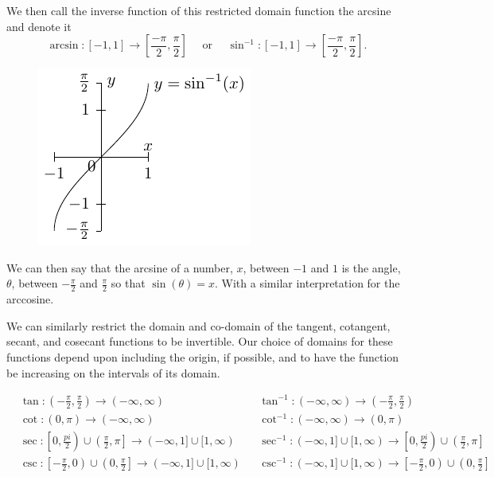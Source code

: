 \documentclass[
]{book}
\theoremstyle{definition}
\theoremstyle{definition}
\theoremstyle{definition}
\theoremstyle{definition}
\theoremstyle{remark}
\begin{document}
We then call the inverse function of this restricted domain function the arcsine and denote it
\[\arcsin:[-1,1] \rightarrow \left[\frac{-\pi}{2}, \frac{\pi}{2}\right] \quad \mbox{ or } \quad \sin^{-1}:[-1,1] \rightarrow \left[\frac{-\pi}{2}, \frac{\pi}{2}\right].\]

\begin{figure}

{\centering \includegraphics[width=0.4\linewidth]{tikz/arcsine} 

}

\end{figure}

We can then say that the arcsine of a number, \(x\), between \(-1\) and \(1\) is the angle, \(\theta\), between \(-\frac{\pi}{2}\) and \(\frac{\pi}{2}\) so that \(\sin(\theta) = x\). With a similar interpretation for the arccosine.

We can similarly restrict the domain and co-domain of the tangent, cotangent, secant, and cosecant functions to be invertible. Our choice of domains for these functions depend upon including the origin, if possible, and to have the function be increasing on the intervals of its domain.

\begin{align*}
  & \tan:\left( -\frac{\pi}{2},\frac{\pi}{2} \right) \rightarrow (-\infty,\infty) & & \tan^{-1}: (-\infty,\infty) \rightarrow \left( -\frac{\pi}{2},\frac{\pi}{2} \right)  \\
  & \cot:\left( 0,\pi\right) \rightarrow (-\infty,\infty)  & & \cot^{-1}: (-\infty,\infty)  \rightarrow \left( 0,\pi\right)  \\
  &  \sec: \left[0,\frac{pi}{2}\right) \cup \left(\frac{\pi}{2},\pi\right] \rightarrow (-\infty,1]\cup [1,\infty) & & \sec^{-1}: (-\infty,1]\cup [1,\infty)  \rightarrow \left[0,\frac{pi}{2}\right) \cup \left(\frac{\pi}{2},\pi\right]  \\
  &  \csc: \left[-\frac{\pi}{2},0\right) \cup \left( 0,\frac{\pi}{2}\right] \rightarrow (-\infty,1]\cup [1,\infty)  & & \csc^{-1}: (-\infty,1]\cup [1,\infty)\rightarrow  \left[-\frac{\pi}{2},0\right) \cup \left( 0,\frac{\pi}{2}\right]   \\
\end{align*}
\end{document}
